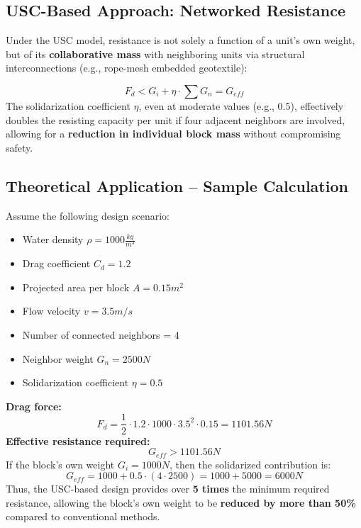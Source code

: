\documentclass[Journal,letterpaper]{ascelike-new}
\begin{document}
\subsection{USC-Based Approach: Networked Resistance}

Under the USC model, resistance is not solely a function of a unit's own weight, but of its \textbf{collaborative mass} with neighboring units via structural interconnections (e.g., rope-mesh embedded geotextile):

\[F_d<G_i+\eta \cdot \sum{G_n}=G_{eff}\]
The solidarization coefficient $\eta $, even at moderate values (e.g., 0.5), effectively doubles the resisting capacity per unit if four adjacent neighbors are involved, allowing for a \textbf{reduction in individual block mass} without compromising safety.


\subsection{Theoretical Application -- Sample Calculation}

Assume the following design scenario:

\begin{itemize}
\item  Water density $\rho =1000\frac{kg}{m^3}$

\item  Drag coefficient $C_d=1.2$

\item  Projected area per block $A=0.15m^2$

\item  Flow velocity $v=3.5m/s$

\item  Number of connected neighbors = 4

\item  Neighbor weight $G_n=2500N$

\item  Solidarization coefficient $\eta =0.5$
\end{itemize}

\textbf{Drag force:}
\[F_d=\frac{1}{2}\cdot 1.2\cdot 1000\cdot {3.5}^2\cdot 0.15=1101.56N\]
\textbf{Effective resistance required:}
\[G_{eff}>1101.56N\]
If the block's own weight $G_i=1000N$, then the solidarized contribution is:
\[G_{eff}=1000+0.5\cdot (4\cdot 2500)=1000+5000=6000N\]
Thus, the USC-based design provides over \textbf{5 times} the minimum required resistance, allowing the block's own weight to be \textbf{reduced by more than 50\%} compared to conventional methods.
\end{document}
